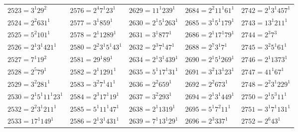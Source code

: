 {\begin{longtable}[c]{*{5}{l}}
$2523=3^{1}29^{2}$&$2576=2^{4}7^{1}23^{1}$&$2629=11^{1}239^{1}$&$2684=2^{2}11^{1}61^{1}$&$2742=2^{1}3^{1}457^{1}$\\
$2524=2^{2}631^{1}$&$2577=3^{1}859^{1}$&$2630=2^{1}5^{1}263^{1}$&$2685=3^{1}5^{1}179^{1}$&$2743=13^{1}211^{1}$\\
$2525=5^{2}101^{1}$&$2578=2^{1}1289^{1}$&$2631=3^{1}877^{1}$&$2686=2^{1}17^{1}79^{1}$&$2744=2^{3}7^{3}$\\
$2526=2^{1}3^{1}421^{1}$&$2580=2^{2}3^{1}5^{1}43^{1}$&$2632=2^{3}7^{1}47^{1}$&$2688=2^{7}3^{1}7^{1}$&$2745=3^{2}5^{1}61^{1}$\\
$2527=7^{1}19^{2}$&$2581=29^{1}89^{1}$&$2634=2^{1}3^{1}439^{1}$&$2690=2^{1}5^{1}269^{1}$&$2746=2^{1}1373^{1}$\\
$2528=2^{5}79^{1}$&$2582=2^{1}1291^{1}$&$2635=5^{1}17^{1}31^{1}$&$2691=3^{2}13^{1}23^{1}$&$2747=41^{1}67^{1}$\\
$2529=3^{2}281^{1}$&$2583=3^{2}7^{1}41^{1}$&$2636=2^{2}659^{1}$&$2692=2^{2}673^{1}$&$2748=2^{2}3^{1}229^{1}$\\
$2530=2^{1}5^{1}11^{1}23^{1}$&$2584=2^{3}17^{1}19^{1}$&$2637=3^{2}293^{1}$&$2694=2^{1}3^{1}449^{1}$&$2750=2^{1}5^{3}11^{1}$\\
$2532=2^{2}3^{1}211^{1}$&$2585=5^{1}11^{1}47^{1}$&$2638=2^{1}1319^{1}$&$2695=5^{1}7^{2}11^{1}$&$2751=3^{1}7^{1}131^{1}$\\
$2533=17^{1}149^{1}$&$2586=2^{1}3^{1}431^{1}$&$2639=7^{1}13^{1}29^{1}$&$2696=2^{3}337^{1}$&$2752=2^{6}43^{1}$\\
\end{longtable}}